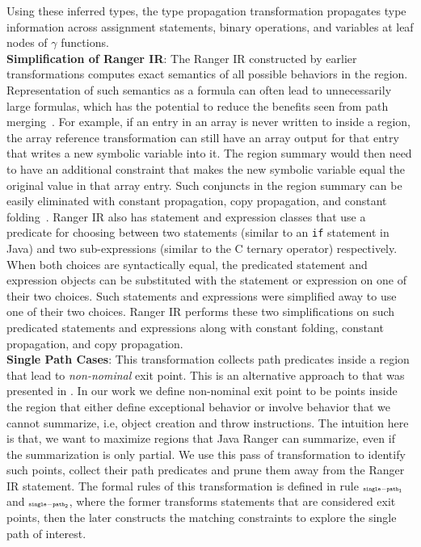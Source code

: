 %
Using these inferred types, the type propagation transformation propagates type information across assignment
statements, binary operations, and variables at leaf nodes of $\gamma$ functions.\\
%
\textbf{Simplification of Ranger IR}: The Ranger IR constructed by earlier transformations computes exact semantics
of all possible behaviors in the region.
%
Representation of such semantics as a formula can often lead to unnecessarily large formulas, which has the potential to
reduce the benefits seen from path merging~\cite{angr}.
%
For example, if an entry in an array is never written to inside a region, the array reference transformation can still have an
array output for that entry that writes a new symbolic variable into it.
%
The region summary would then need to have an additional constraint that makes the new symbolic variable equal the
original value in that array entry.
%
Such conjuncts in the region summary can be easily eliminated with constant propagation, copy propagation, and constant
folding~\cite{dragon-book}.
%
Ranger IR also has statement and expression classes that use a predicate for choosing between two statements (similar to
an {\tt if} statement in Java) and two sub-expressions (similar to the C ternary operator) respectively.
%
When both choices are syntactically equal, the predicated statement and expression objects can be substituted with the
statement or expression on one of their two choices.
%
Such statements and expressions were simplified away to use one of their two choices.
%
Ranger IR performs these two simplifications on such predicated statements and expressions along with constant folding,
constant propagation, and copy propagation.\\
\textbf{Single Path Cases}: This transformation collects path predicates inside a region that lead to
\textit{non-nominal} exit point.
%
This is an alternative approach to that was presented in \cite{veritesting}.
%
In our work we define non-nominal exit point to be points inside the region that either define exceptional behavior or
involve behavior that we cannot summarize, i.e, object creation and throw instructions.
%
The intuition here is that, we want to maximize regions that Java Ranger can summarize, even if the summarization is
only partial.
%
We use this pass of transformation to identify such points, collect their path predicates and prune them away from the
Ranger IR statement. The formal rules of this transformation is defined in rule $\scriptscriptstyle\mathtt{single-path_1}$ and $\scriptscriptstyle\mathtt{single-path_2}$, where the former transforms statements that are considered exit points, then the later constructs the matching constraints to explore the single path of interest. 
